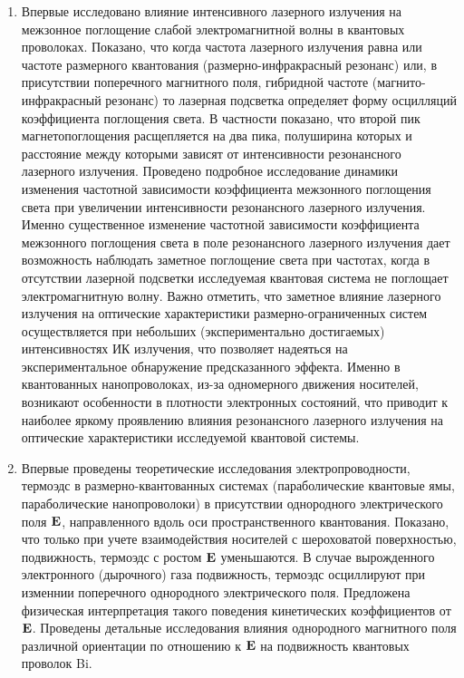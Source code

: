 \begin{enumerate}
  \item Впервые исследовано влияние интенсивного лазерного излучения на межзонное поглощение слабой электромагнитной волны в квантовых проволоках. Показано, что когда частота лазерного излучения равна или частоте размерного квантования (размерно-инфракрасный резонанс) или, в присутствии поперечного магнитного поля, гибридной частоте (магнито-инфракрасный резонанс) то лазерная подсветка определяет форму осцилляций коэффициента поглощения света. В частности показано, что второй пик магнетопоглощения расщепляется на два пика, полуширина которых и расстояние между которыми зависят от интенсивности резонансного лазерного излучения. Проведено подробное исследование динамики изменения частотной зависимости коэффициента межзонного поглощения света при увеличении интенсивности резонансного лазерного излучения. Именно существенное изменение частотной зависимости коэффициента межзонного поглощения света в поле резонансного лазерного излучения дает возможность наблюдать заметное поглощение света при частотах, когда в отсутствии лазерной подсветки исследуемая квантовая система не поглощает электромагнитную волну.
  Важно отметить, что заметное влияние лазерного излучения на оптические характеристики размерно-ограниченных систем осуществляется при небольших (экспериментально достигаемых) интенсивностях ИК излучения, что позволяет надеяться на экспериментальное обнаружение предсказанного эффекта. Именно в квантованных нанопроволоках, из-за одномерного движения носителей, возникают особенности в плотности электронных состояний, что приводит к наиболее яркому проявлению влияния резонансного лазерного излучения на оптические характеристики исследуемой квантовой системы.
  \item Впервые проведены теоретические исследования электропроводности, термоэдс в размерно-квантованных системах (параболические квантовые ямы, параболические нанопроволоки) в присутствии однородного электрического поля $\boldsymbol{\mathbf{E}}$, направленного вдоль оси пространственного квантования. 
  Показано, что только при учете взаимодействия носителей с шероховатой поверхностью, подвижность, термоэдс с ростом $\boldsymbol{\mathbf{E}}$ уменьшаются. В случае вырожденного электронного (дырочного) газа подвижность, термоэдс осциллируют при изменнии поперечного однородного электрического поля. Предложена физическая интерпретация такого поведения кинетических коэффициентов от  $\boldsymbol{\mathbf{E}}$. Проведены детальные исследования влияния однородного магнитного поля различной ориентации по отношению к $\boldsymbol{\mathbf{E}}$ на подвижность квантовых проволок Bi.
\end{enumerate}
